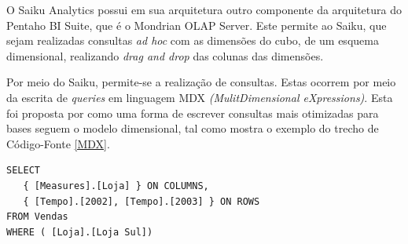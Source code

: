 O Saiku Analytics possui em sua arquitetura outro componente da arquitetura do Pentaho BI Suite, que é o Mondrian OLAP Server. Este permite ao Saiku, que sejam realizadas consultas \textit{ad hoc} com as dimensões do cubo, de um esquema dimensional, realizando \textit{drag and drop} das colunas das dimensões.

Por meio do Saiku, permite-se a realização de consultas. Estas ocorrem por meio da escrita de \textit{queries} em linguagem MDX \textit{(MulitDimensional eXpressions)}. Esta foi proposta por  como uma forma de escrever consultas mais otimizadas para bases seguem o modelo dimensional, tal como mostra o exemplo do trecho de Código-Fonte \ref{MDX}.




\begin{center}
\begin{minipage}{0.5\textwidth}

\begin{lstlisting}[caption=Exemplo de \textit{Query} em linguagem MDX, label=MDX]
 SELECT
   { [Measures].[Loja] } ON COLUMNS,
   { [Tempo].[2002], [Tempo].[2003] } ON ROWS
FROM Vendas
WHERE ( [Loja].[Loja Sul]) 

\end{lstlisting}
\end{minipage}
\end{center}
\FloatBarrier


 
